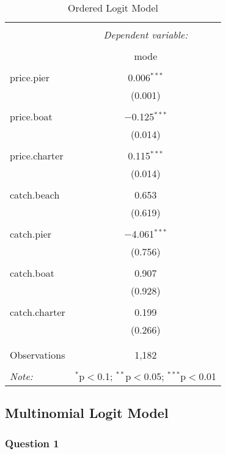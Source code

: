 \documentclass[11pt]{article}
\begin{document}
{%
\begin{table}[H] \centering 
  \caption{Ordered Logit Model} 
  \label{} 
\begin{tabular}{@{\extracolsep{5pt}}lc} 
\\[-1.8ex]\hline 
\hline \\[-1.8ex] 
 & \multicolumn{1}{c}{\textit{Dependent variable:}} \\ 
\cline{2-2} 
\\[-1.8ex] & mode \\ 
\hline \\[-1.8ex] 
 price.pier & 0.006$^{***}$ \\ 
  & (0.001) \\ 
  & \\ 
 price.boat & $-$0.125$^{***}$ \\ 
  & (0.014) \\ 
  & \\ 
 price.charter & 0.115$^{***}$ \\ 
  & (0.014) \\ 
  & \\ 
 catch.beach & 0.653 \\ 
  & (0.619) \\ 
  & \\ 
 catch.pier & $-$4.061$^{***}$ \\ 
  & (0.756) \\ 
  & \\ 
 catch.boat & 0.907 \\ 
  & (0.928) \\ 
  & \\ 
 catch.charter & 0.199 \\ 
  & (0.266) \\ 
  & \\ 
\hline \\[-1.8ex] 
Observations & 1,182 \\ 
\hline 
\hline \\[-1.8ex] 
\textit{Note:}  & \multicolumn{1}{r}{$^{*}$p$<$0.1; $^{**}$p$<$0.05; $^{***}$p$<$0.01} \\ 
\end{tabular} 
\end{table} 


\subsection*{Multinomial Logit Model}
\subsubsection*{Question 1}

}
\end{document}
